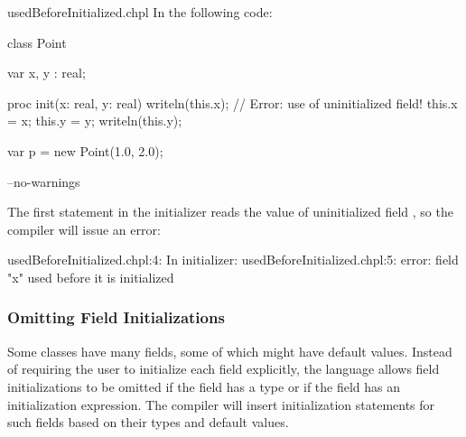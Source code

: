 \begin{chapelexample}{usedBeforeInitialized.chpl}
In the following code:
\begin{chapel}
class Point {
  var x, y : real;

  proc init(x: real, y: real) {
    writeln(this.x); // Error: use of uninitialized field!
    this.x = x;
    this.y = y;
    writeln(this.y);
  }
}
var p = new Point(1.0, 2.0);
\end{chapel}
\begin{chapelcompopts}
--no-warnings
\end{chapelcompopts}

The first statement in the initializer reads the value of uninitialized field
, so the compiler will issue an error:

\begin{chapelprintoutput}{}
usedBeforeInitialized.chpl:4: In initializer:
usedBeforeInitialized.chpl:5: error: field "x" used before it is initialized
\end{chapelprintoutput}

\end{chapelexample}

\subsubsection{Omitting Field Initializations}
\label{Omitting_Field_Initializations}

Some classes have many fields, some of which might have default values. Instead
of requiring the user to initialize each field explicitly, the language allows
field initializations to be omitted if the field has a type or if the field
has an initialization expression. The compiler will insert initialization
statements for such fields based on their types and default values.

